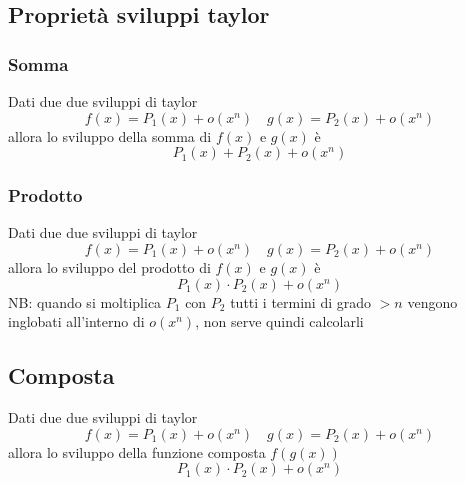 \subsection{Proprietà sviluppi taylor}
\subsubsection{Somma}
Dati due due sviluppi di taylor
\[
	f\left( x \right) = P_1\left( x \right)  + o\left( x^{n} \right) \quad g\left( x \right) = P_2\left( x \right)  + o\left( x^{n} \right)
\]
allora lo sviluppo della somma di $f\left( x \right) $ e $g\left( x \right) $ è
\[
	P_1\left( x \right)  + P_2\left( x \right) + o\left( x^{n} \right)
\]
\subsubsection{Prodotto}
Dati due due sviluppi di taylor
\[
	f\left( x \right) = P_1\left( x \right)  + o\left( x^{n} \right) \quad g\left( x \right) = P_2\left( x \right)  + o\left( x^{n} \right)
\]
allora lo sviluppo del prodotto di $f\left( x \right) $ e $g\left( x \right) $ è
\[
	P_1\left( x \right)  \cdot P_2\left( x \right) + o\left( x^{n} \right)
\]
NB: quando si moltiplica $P_1$ con $P_2$ tutti i termini di grado $ >n$ vengono inglobati all'interno di $o\left( x^{n} \right) $, non serve quindi calcolarli
\subsection{Composta}
Dati due due sviluppi di taylor
\[
	f\left( x \right) = P_1\left( x \right)  + o\left( x^{n} \right) \quad g\left( x \right) = P_2\left( x \right)  + o\left( x^{n} \right)
\]
allora lo sviluppo della funzione composta $f\left( g\left( x \right)  \right) $
\[
	P_1\left( x \right)  \cdot P_2\left( x \right) + o\left( x^{n} \right)
\]
